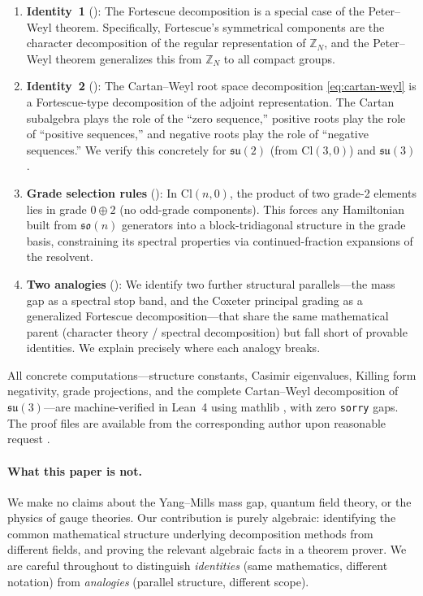 \documentclass[11pt]{article}
\newcommand{\so}{\mathfrak{so}}
\newcommand{\su}{\mathfrak{su}}
\newcommand{\Cl}{\mathrm{Cl}}
\newcommand{\ZZ}{\mathbb{Z}}
\begin{document}
\begin{enumerate}[leftmargin=*]
\item \textbf{Identity~1} (): The Fortescue
  decomposition is a special case of the Peter--Weyl theorem.
  Specifically, Fortescue's symmetrical components are the character
  decomposition of the regular representation of $\ZZ_N$, and the
  Peter--Weyl theorem generalizes this from $\ZZ_N$ to all compact
  groups.

\item \textbf{Identity~2} (): The
  Cartan--Weyl root space decomposition \eqref{eq:cartan-weyl} is a
  Fortescue-type decomposition of the adjoint representation. The
  Cartan subalgebra plays the role of the ``zero sequence,'' positive
  roots play the role of ``positive sequences,'' and negative roots
  play the role of ``negative sequences.'' We verify this concretely
  for $\su(2)$ (from $\Cl(3,0)$) and $\su(3)$.

\item \textbf{Grade selection rules} ():
  In $\Cl(n,0)$, the product of two grade-2 elements lies in grade
  $0 \oplus 2$ (no odd-grade components). This forces any Hamiltonian
  built from $\so(n)$ generators into a block-tridiagonal structure in
  the grade basis, constraining its spectral properties via
  continued-fraction expansions of the resolvent.

\item \textbf{Two analogies} ():
  We identify two further structural parallels---the mass gap as a
  spectral stop band, and the Coxeter principal grading as a
  generalized Fortescue decomposition---that share the same
  mathematical parent (character theory / spectral decomposition) but
  fall short of provable identities. We explain precisely where each
  analogy breaks.
\end{enumerate}

All concrete computations---structure constants, Casimir eigenvalues,
Killing form negativity, grade projections, and the complete
Cartan--Weyl decomposition of $\su(3)$---are machine-verified in
Lean~4 \cite{demoura2021lean4} using mathlib \cite{mathlib}, with zero
\texttt{sorry} gaps. The proof files are available from the
corresponding author upon reasonable request \cite{uft-github}.

\paragraph{What this paper is not.}
We make no claims about the Yang--Mills mass gap, quantum field theory,
or the physics of gauge theories. Our contribution is purely algebraic:
identifying the common mathematical structure underlying decomposition
methods from different fields, and proving the relevant algebraic facts
in a theorem prover. We are careful throughout to distinguish
\emph{identities} (same mathematics, different notation) from
\emph{analogies} (parallel structure, different scope).
\end{document}
